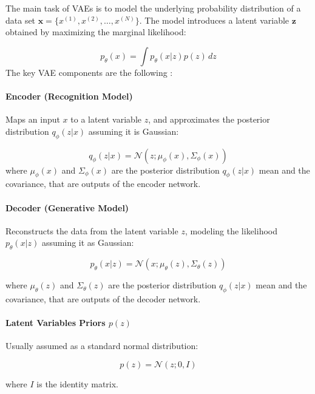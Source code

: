 \documentclass{ieeeaccess}
\providecommand{\DIFdelend}{} %
\DeclareRobustCommand{\DIFdelend}{\DIFOaddend \let\includegraphics\DIFOincludegraphics} %
\begin{document}
\DIFdelend The main task of VAEs is to model the underlying probability distribution of a data set $\mathbf{x} = \{x^{(1)}, x^{(2)}, \ldots, x^{(N)}\}$. The model introduces a latent variable $\mathbf{z}$ obtained by maximizing the marginal likelihood:

\begin{equation}
p_\theta(x) = \int p_\theta(x | z) p(z) \, dz
\end{equation}
The key VAE components are the following :

\paragraph{Encoder (Recognition Model)}
Maps an input $x$ to a latent variable $z$, and approximates the posterior distribution $q_\phi(z | x)$ assuming it is Gaussian:

\begin{equation}
q_\phi(z | x) = \mathcal{N}(z; \mu_\phi(x), \Sigma_\phi(x))
\end{equation}
where $\mu_\phi(x)$ and $\Sigma_\phi(x)$ are the posterior distribution $q_\phi(z | x)$ mean and the covariance, that are outputs of the encoder network.

\paragraph{Decoder (Generative Model)}
Reconstructs the data from the latent variable $z$, modeling the likelihood $p_\theta(x | z)$ assuming it as Gaussian:

\begin{equation}
p_\theta(x | z) = \mathcal{N}(x; \mu_\theta(z), \Sigma_\theta(z))
\end{equation}

where $\mu_\theta(z)$ and $\Sigma_\theta(z)$ are the posterior distribution $q_\phi(z | x)$ mean and the covariance, that are outputs of the decoder network.

\paragraph{Latent Variables Priors $p(z)$}
Usually assumed as a standard normal distribution:

\begin{equation}
p(z) = \mathcal{N}(z; 0, I)
\end{equation}

where $I$ is the identity matrix.
\end{document}

